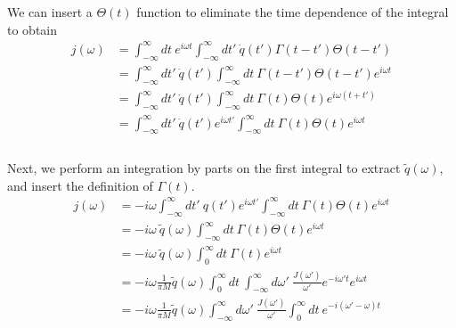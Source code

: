 \documentclass[]{article}
\begin{document}
\begin{enumerate}[1)]
We can insert a $\Theta(t)$ function to eliminate the time dependence of the integral to obtain \\

\begin{equation}
\begin{aligned}
j(\omega) & = \int_{-\infty}^{\infty} dt \: e^{ i \omega t } \int_{-\infty}^{\infty} dt' \: \dot{q}(t') \Gamma(t - t' ) \Theta( t - t' )  \\ %
& =  \int_{-\infty}^{\infty} dt' \:  \dot{q}(t')  \int_{-\infty}^{\infty} dt \:  \Gamma(t - t' ) \Theta( t - t' )  e^{ i \omega t } \\
%
& =  \int_{-\infty}^{\infty} dt' \:  \dot{q}(t')  \int_{-\infty}^{\infty} dt \:   \Gamma(t  ) \Theta( t )  e^{ i \omega ( t + t') } \\
%
& =  \int_{-\infty}^{\infty} dt' \:  \dot{q}(t') e^{ i \omega t' } \int_{-\infty}^{\infty} dt \:   \Gamma(t  ) \Theta( t )  e^{ i \omega  t  } \\
%
\end{aligned}
\end{equation} \\

Next, we perform an integration by parts on the first integral to extract $\tilde{q}(\omega)$, and insert the definition of $\Gamma(t)$. \\

\begin{equation}
\begin{aligned}
j(\omega) & = - i \omega \int_{-\infty}^{\infty} dt' \:  q(t') e^{ i \omega t' } \int_{-\infty}^{\infty} dt \:   \Gamma(t  ) \Theta( t )  e^{ i \omega  t  } \\
%
& = - i \omega \:  \tilde{q}(\omega)  \int_{-\infty}^{\infty} dt \:   \Gamma(t  ) \Theta( t )  e^{ i \omega  t  } \\
%
& = - i \omega \:  \tilde{q}(\omega)  \int_{0}^{\infty} dt \:   \Gamma(t  )   e^{ i \omega  t  } \\
%
& = - i \omega  \frac{ 1 }{ \pi M } \tilde{q}(\omega)  \int_{0}^{\infty} dt \:   \int_{-\infty}^{\infty} d\omega' \: \frac{  J( \omega' ) }{ \omega' } e^{ - i \omega' t }   e^{ i \omega  t  } \\
%
& = - i \omega  \frac{ 1 }{ \pi M } \tilde{q}(\omega)    \int_{-\infty}^{\infty} d\omega' \: \frac{  J( \omega' ) }{ \omega' }  \int_{0}^{\infty} dt \:   e^{ - i ( \omega' - \omega )  t  } \\
%
\end{aligned}
\end{equation} \\


\end{enumerate}
\end{document}
